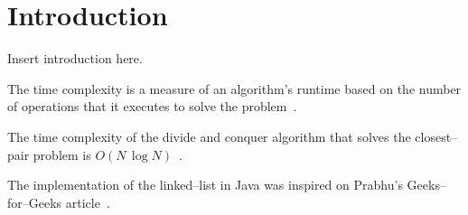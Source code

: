 \section{Introduction} %
Insert introduction here.

The time complexity is a measure of an algorithm's runtime
based on the number of operations that it executes to solve the
problem~\cite{Cormen2009}.

The time complexity of the divide and conquer algorithm that solves the
closest--pair problem is $O(N \, \log N)$~\cite{PereiraLobo2012}.

The implementation of the linked--list in Java was inspired on Prabhu's
Geeks--for--Geeks article~\cite{LinkedListRishabhPrabhu}.
